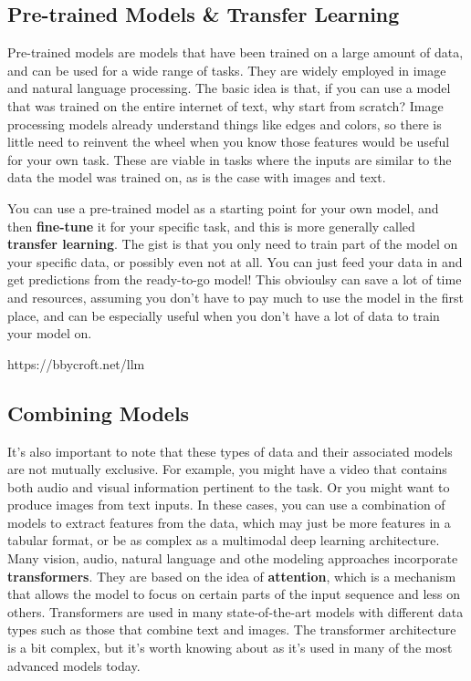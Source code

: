 \documentclass[
  letterpaper,
]{krantz}
\begin{document}
\subsection{Pre-trained Models \& Transfer
Learning}\label{pre-trained-models-transfer-learning}

Pre-trained models are models that have been trained on a large amount
of data, and can be used for a wide range of tasks. They are widely
employed in image and natural language processing. The basic idea is
that, if you can use a model that was trained on the entire internet of
text, why start from scratch? Image processing models already understand
things like edges and colors, so there is little need to reinvent the
wheel when you know those features would be useful for your own task.
These are viable in tasks where the inputs are similar to the data the
model was trained on, as is the case with images and text.

You can use a pre-trained model as a starting point for your own model,
and then \textbf{fine-tune} it for your specific task, and this is more
generally called \textbf{transfer learning}. The gist is that you only
need to train part of the model on your specific data, or possibly even
not at all. You can just feed your data in and get predictions from the
ready-to-go model! This obvioulsy can save a lot of time and resources,
assuming you don't have to pay much to use the model in the first place,
and can be especially useful when you don't have a lot of data to train
your model on.

https://bbycroft.net/llm

\subsection{Combining Models}\label{combining-models}

It's also important to note that these types of data and their
associated models are not mutually exclusive. For example, you might
have a video that contains both audio and visual information pertinent
to the task. Or you might want to produce images from text inputs. In
these cases, you can use a combination of models to extract features
from the data, which may just be more features in a tabular format, or
be as complex as a multimodal deep learning architecture. Many vision,
audio, natural language and othe modeling approaches incorporate
\textbf{transformers}. They are based on the idea of \textbf{attention},
which is a mechanism that allows the model to focus on certain parts of
the input sequence and less on others. Transformers are used in many
state-of-the-art models with different data types such as those that
combine text and images. The transformer architecture is a bit complex,
but it's worth knowing about as it's used in many of the most advanced
models today.
\end{document}
